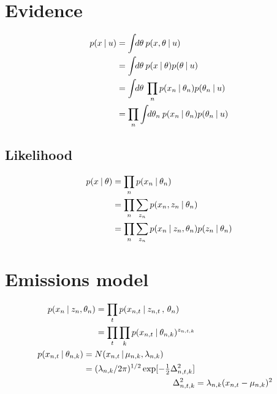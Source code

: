 \section{Evidence}
\begin{align}
  \begin{split}
  \p{x}{u} 
       &= \int \d{\theta} \p{x, \theta}{u} \\
       &= \int \d{\theta} \p{x}{\theta} \p{\theta}{u} \\ 
       &= \int \d{\theta} \prod_n \p{x_n}{\theta_n} \p{\theta_n}{u} \\ 
       &= \prod_n  \int \d{\theta_n} \p{x_n}{\theta_n} \p{\theta_n}{u}
  \end{split}  
\end{align}

\subsection{Likelihood}
\begin{align}
  \begin{split}
  p(x \:|\: \theta) &= \prod_n p(x_n \:|\: \theta_n) \\
                &= \prod_n \sum_{z_n} p(x_n , z_n \:|\: \theta_n) \\
                &= \prod_n \sum_{z_n} p(x_n \:|\: z_n, \theta_n) p(z_n \:|\: \theta_n)
  \end{split}
\end{align}

\section{Emissions model}
\begin{align}
  \begin{split}
  p(x_n \:|\: z_n, \theta_n) &= \prod_t 
                            p(x_{n,t} \:|\: z_{n,t} \,,\, \theta_{n}) \\
                         &= \prod_t \prod_k 
                            p(x_{n,t} \:|\: \theta_{n,k})^{z_{n,t,k}}
  \end{split}\\
  \begin{split}
    p(x_{n,t} \:|\: \theta_{n,k}) 
    &= N(x_{n,t} \,|\, \mu_{n,k}, \lambda_{n,k}) \\ 
    &= (\lambda_{n,k}/2\pi)^{1/2} \exp[-\tfrac{1}{2} \Delta_{n,t,k}^2] 
  \end{split} \\
  \Delta_{n,t,k}^2
  &= 
  \lambda_{n,k} (x_{n,t} - \mu_{n,k})^2
\end{align}

